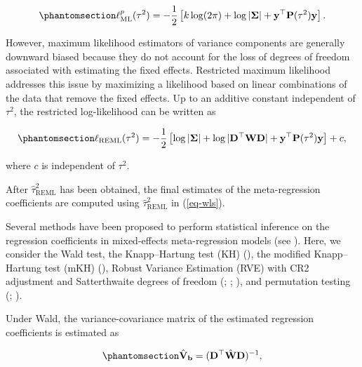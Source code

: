 \documentclass[
  man,
  longtable,
  nolmodern,
  notxfonts,
  notimes,
  colorlinks=true,linkcolor=blue,citecolor=blue,urlcolor=blue]{apa7}
\begin{document}
\begin{equation}\phantomsection\label{eq-ml-profile}{
\ell_{\mathrm{ML}}^{p}(\tau^2)
=
-\frac{1}{2}
\left[
k\log(2\pi)
+
\log|\boldsymbol{\Sigma}|
+
\mathbf{y}^{\top}\mathbf{P}(\tau^2)\mathbf{y}
\right].
}\end{equation}

However, maximum likelihood estimators of variance components are
generally downward biased because they do not account for the loss of
degrees of freedom associated with estimating the fixed effects.
Restricted maximum likelihood addresses this issue by maximizing a
likelihood based on linear combinations of the data that remove the
fixed effects. Up to an additive constant independent of \(\tau^2\), the
restricted log-likelihood can be written as

\begin{equation}\phantomsection\label{eq-reml-loglik}{
\ell_{\mathrm{REML}}(\tau^2)
=
-\frac{1}{2}
\left[
\log|\boldsymbol{\Sigma}|
+
\log|\mathbf{D}^{\top}\mathbf{W}\mathbf{D}|
+
\mathbf{y}^{\top}\mathbf{P}(\tau^2)\mathbf{y}
\right]
+ c,
}\end{equation}

where \(c\) is independent of \(\tau^2\).

After \(\hat{\tau}^2_{\mathrm{REML}}\) has been obtained, the final
estimates of the meta-regression coefficients are computed using
\(\hat{\tau}^2_{\mathrm{REML}}\) in (\ref{eq-wls}).

Several methods have been proposed to perform statistical inference on
the regression coefficients in mixed-effects meta-regression models (see
). Here, we
consider the Wald test, the Knapp--Hartung test (KH)
(), the modified
Knapp--Hartung test (mKH) (), Robust Variance Estimation (RVE) with CR2 adjustment and
Satterthwaite degrees of freedom
(;
;
), and permutation testing
(;
).

Under Wald, the variance-covariance matrix of the estimated regression
coefficients is estimated as

\begin{equation}\phantomsection\label{eq-vb-wald}{
\hat{\mathbf{V}}_{\mathbf{b}}
=
(\mathbf{D}^{\top}\hat{\mathbf{W}}\mathbf{D})^{-1},
}\end{equation}
\end{document}
